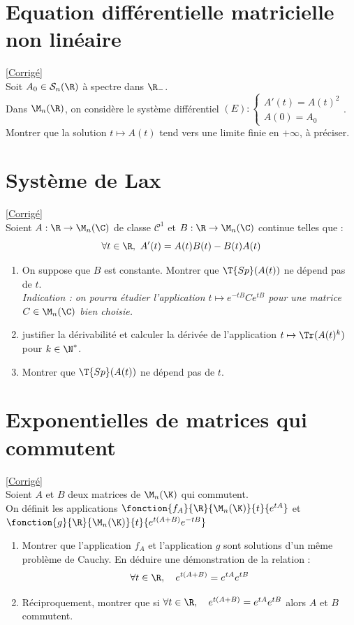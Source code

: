 \documentclass{book}
\begin{document}
\section{Equation différentielle matricielle non linéaire}
\label{Equation différentielle matricielle non linéaire}
\textcolor{blue}{\hyperref[sec:equation-differentielle-matricielle-non-lineaire]{[Corrigé]}}\\
Soit $A_0\in\mathcal S_n(\R)$ à spectre dans $\R_-$.
\\Dans $\M_n(\R)$, on considère le système différentiel $(E):\begin{cases}
	A'(t)=A(t)^2 \\
	A(0)=A_0
\end{cases}$.\\
Montrer que la solution $t\mapsto A(t)$ tend vers une limite finie en $+\infty$, à préciser.

\section{Système de Lax }
\textcolor{blue}{\hyperref[Système de Lax corrigé]{[Corrigé]}}\\
\label{Système de Lax}
Soient $A:\R\to \M_n(\C)$ de classe $\mathcal C^1$ et $B:\R\to \M_n(\C)$ continue telles que :
$$\forall t\in \R,\ A'(t)=A(t)B(t)-B(t)A(t)$$
\begin{enumerate}
	\item On suppose que $B$ est constante. Montrer que $\T{Sp}(A(t))$ ne dépend pas de $t$.\\
	\textit{Indication : on pourra étudier l'application $t\mapsto e^{-tB}Ce^{tB}$ pour une matrice $C\in \M_n(\C)$ bien choisie.}
	\item justifier la dérivabilité et calculer la dérivée de l'application $t\mapsto \Tr(A(t)^k)$ pour $k\in \N^*$.
	\item Montrer que $\T{Sp}(A(t))$ ne dépend pas de $t$.
\end{enumerate}

\section{Exponentielles de matrices qui commutent }
\textcolor{blue}{\hyperref[sec:exponentielles-de-matrices-qui-commutent-etoile2]{[Corrigé]}}\\
\label{Exponentielles de matrices qui commutent}
Soient $A$ et $B$ deux matrices de $\M_n(\K)$ qui commutent. \\
On définit les applications $\fonction{f_A}{\R}{\M_n(\K)}{t}{e^{tA}}$ et $\fonction{g}{\R}{\M_n(\K)}{t}{e^{t(A+B)}e^{-tB}}$
\begin{enumerate}
	\item Montrer que l'application $f_A$ et l'application $g$ sont solutions d'un même problème de Cauchy. En déduire une démonstration de la relation : $$\forall t\in\R, \quad e^{t(A+B)}=e^{tA}e^{tB}$$
	\item Réciproquement, montrer que si $\forall t\in\R, \quad e^{t(A+B)}=e^{tA}e^{tB}$ alors $A$ et $B$ commutent.
\end{enumerate}
\end{document}
